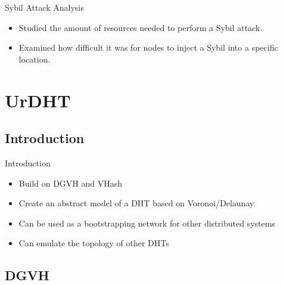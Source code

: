 \documentclass[11pt]{beamer}
\begin{document}
\begin{frame}{Sybil Attack Analysis}
\begin{itemize}
	\item Studied the amount of resources needed to perform a Sybil attack.
	\item Examined how difficult it was for nodes to inject a Sybil into a specific location.
\end{itemize}


\end{frame}



\section{UrDHT}

\subsection{Introduction}
\begin{frame}{Introduction}
	\begin{itemize}
		\item Build on DGVH and VHash
		\item Create an abstract model of a DHT based on Voronoi/Delaunay 
		\item Can be used as a bootstrapping network for other distributed systems
		\item Can emulate the topology of other DHTs
	\end{itemize}
\end{frame}





\subsection{DGVH}
\end{document}
